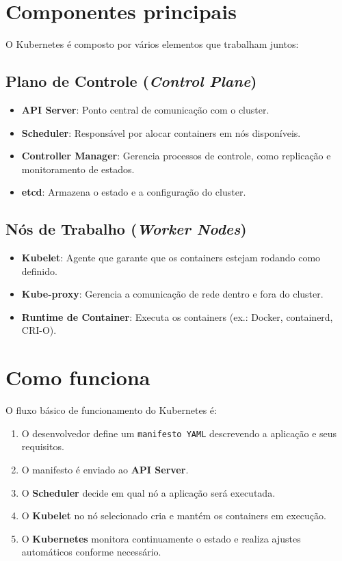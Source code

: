 \documentclass{abntex2}
\begin{document}
\section{Componentes principais}
O Kubernetes é composto por vários elementos que trabalham juntos:
\subsection{Plano de Controle (\textit{Control Plane})}
\begin{itemize}
    \item \textbf{API Server}: Ponto central de comunicação com o cluster.
    \item \textbf{Scheduler}: Responsável por alocar containers em nós disponíveis.
    \item \textbf{Controller Manager}: Gerencia processos de controle, como replicação e monitoramento de estados.
    \item \textbf{etcd}: Armazena o estado e a configuração do cluster.
\end{itemize}

\subsection{Nós de Trabalho (\textit{Worker Nodes})}
\begin{itemize}
    \item \textbf{Kubelet}: Agente que garante que os containers estejam rodando como definido.
    \item \textbf{Kube-proxy}: Gerencia a comunicação de rede dentro e fora do cluster.
    \item \textbf{Runtime de Container}: Executa os containers (ex.: Docker, containerd, CRI-O).
\end{itemize}

\section{Como funciona}
O fluxo básico de funcionamento do Kubernetes é:
\begin{enumerate}
    \item O desenvolvedor define um \texttt{manifesto YAML} descrevendo a aplicação e seus requisitos.
    \item O manifesto é enviado ao \textbf{API Server}.
    \item O \textbf{Scheduler} decide em qual nó a aplicação será executada.
    \item O \textbf{Kubelet} no nó selecionado cria e mantém os containers em execução.
    \item O \textbf{Kubernetes} monitora continuamente o estado e realiza ajustes automáticos conforme necessário.
\end{enumerate}
\end{document}
